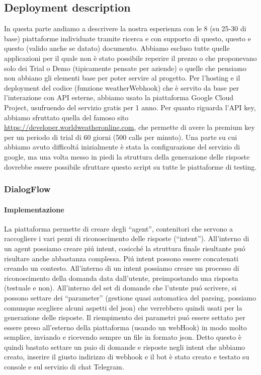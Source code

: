 \documentclass[]{article}
\begin{document}
\subsection{Deployment description}
In questa parte andiamo a descrivere la nostra esperienza con le 8 (su 25-30 di base) piattaforme individuate tramite ricerca e con supporto di questo,  questo e questo (valido anche se datato) documento. Abbiamo escluso tutte quelle applicazioni per il quale non è stato possibile reperire il prezzo o che proponevano solo dei Trial o Demo (tipicamente pensate per aziende) o quelle che pensiamo non abbiano gli elementi base per poter servire al progetto.
Per l’hosting e il deployment del codice (funzione weatherWebhook) che è servito da base per l’interazione con API esterne, abbiamo usato la piattaforma Google Cloud Project, usufruendo del servizio gratis per 1 anno. Per quanto riguarda l’API key, abbiamo sfruttato quella del famoso sito \url{https://developer.worldweatheronline.com}, che permette di avere la premium key per un periodo di trial di 60 giorni (500 calls per minuto). Una parte su cui abbiamo avuto difficoltá inizialmente è stata la configurazione del servizio di google, ma una volta messo in piedi la struttura della generazione delle risposte dovrebbe essere possibile sfruttare questo script su tutte le piattaforme di testing.

\subsubsection{DialogFlow} 
\paragraph{Implementazione}
La piattaforma permette di creare degli “agent”, contenitori che servono a raccogliere i vari pezzi di riconoscimento delle risposte (“intent”). All’interno di un agent possiamo creare piú intent, cosicché  la struttura finale risultante puó risultare anche abbastanza complessa. Piú intent possono essere concatenati creando un contesto. All’interno di un intent possiamo creare un processo di riconoscimento della domanda data dall’utente, preimpostando una risposta (testuale e non). All’interno del set di domande che l’utente puó scrivere, si possono settare dei “parameter” (gestione quasi automatica del parsing, possiamo comunque scegliere alcuni aspetti del json) che verrebbero quindi usati per la generazione delle risposte. Il riempimento dei parametri puó essere settato per essere preso all’esterno della piattaforma (usando un webHook) in modo molto semplice, inviando e ricevendo sempre un file in formato json. Detto questo è quindi bastato settare un paio di domande e risposte negli intent che abbiamo creato, inserire il giusto indirizzo di webhook e il bot è stato creato e testato su console e sul servizio di chat Telegram.
\end{document}
